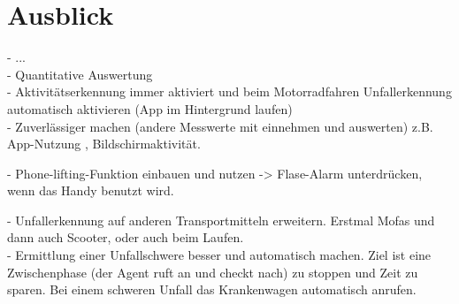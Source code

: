 \chapter{Ausblick}
- ...\\

- Quantitative Auswertung\\

- Aktivitätserkennung immer aktiviert und beim Motorradfahren Unfallerkennung automatisch aktivieren (App im Hintergrund laufen)\\

- Zuverlässiger machen (andere Messwerte mit einnehmen und auswerten) z.B. App-Nutzung , Bildschirmaktivität.

- Phone-lifting-Funktion einbauen und nutzen -> Flase-Alarm unterdrücken, wenn das Handy benutzt wird.

- Unfallerkennung auf anderen Transportmitteln erweitern. Erstmal Mofas und dann auch Scooter, oder auch beim Laufen.\\

- Ermittlung einer Unfallschwere besser und automatisch machen. Ziel ist eine Zwischenphase (der Agent ruft an und checkt nach) zu stoppen und Zeit zu sparen. Bei einem schweren Unfall das Krankenwagen automatisch anrufen.\\




